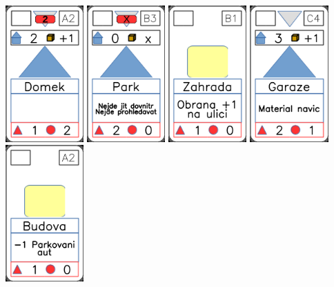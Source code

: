 \documentclass[a4paper]{article}
\begin{document}
	\includegraphics[width=3.0cm]{img-3_1}
	\includegraphics[width=3.0cm]{img-3_22}
	\includegraphics[width=3.0cm]{img-2_20}
	\includegraphics[width=3.0cm]{img-3_13}
	\includegraphics[width=3.0cm]{img-2_1}
\end{document}
